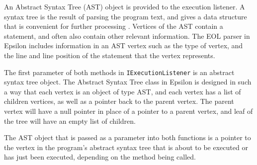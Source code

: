 An Abstract Syntax Tree (AST) object is provided to the execution listener. A syntax tree is the result of parsing the program text, and gives a data structure that is convenient for further processing \citep{grune2000modern}. Vertices of the AST contain a statement, and often also contain other relevant information. The EOL parser in Epsilon includes information in an AST vertex such as the type of vertex, and the line and line position of the statement that the vertex represents.

The first parameter of both methods in \verb+IExecutionListener+ is an abstract syntax tree object. The Abstract Syntax Tree class in Epsilon is designed in such a way that each vertex is an object of type AST, and each vertex has a list of children vertices, as well as a pointer back to the parent vertex. The parent vertex will have a null pointer in place of a pointer to a parent vertex, and leaf of the tree will have an empty list of children.

The AST object that is passed as a parameter into both functions is a pointer to the vertex in the program's abstract syntax tree that is about to be executed or has just been executed, depending on the method being called. 

